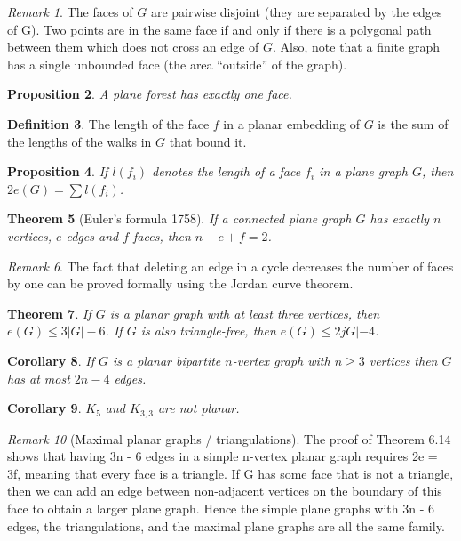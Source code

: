 \documentclass[10pt, fleqn, a4paper, landscape]{article}
\theoremstyle{plain} %
\newtheorem{thm}{Theorem}
\newtheorem{pro}[thm]{Proposition}
\newtheorem{cor}[thm]{Corollary}
\theoremstyle{remark} %
\newtheorem{rem}[thm]{Remark}
\theoremstyle{definition} %
\newtheorem{defi}[thm]{Definition}
\begin{document}
\begin{multicols}{3}
\begin{tiny}
\begin{rem}
The faces of $G$ are pairwise disjoint (they are separated by the edges of G). Two points are in the same face if and only if there is a polygonal path between them which does not cross an edge of $G$. Also, note that a finite graph has a single unbounded face (the area “outside” of the graph).
\end{rem}

\begin{pro}
A plane forest has exactly one face.
\end{pro}

\begin{defi}
The length of the face $f$ in a planar embedding of $G$ is the sum of the lengths of the walks in $G$ that bound it.
\end{defi}
\addtocounter{thm}{1}
\begin{pro}
If $l(f_i)$ denotes the length of a face $f_i$ in a plane graph $G$, then $2e(G) = \sum l(f_i)$.
\end{pro}

\begin{thm}[Euler's formula 1758]
If a connected plane graph $G$ has exactly $n$ vertices, $e$ edges
and $f$ faces, then $n - e + f = 2$.
\end{thm}

\begin{rem}
The fact that deleting an edge in a cycle decreases the number of faces by one can be proved formally using the Jordan curve theorem.
\end{rem}
\begin{thm}
If $G$ is a planar graph with at least three vertices, then $e(G) \le 3|G|- 6$. If $G$ is also triangle-free, then $e(G)\le 2jG|- 4$.
\end{thm}

\begin{cor}
If $G$ is a planar bipartite $n$-vertex graph with $n \ge 3$ vertices then $G$ has at most $2n - 4$ edges.
\end{cor}

\begin{cor}
$K_5$ and $K_{3,3}$ are not planar.
\end{cor}

\begin{rem}[Maximal planar graphs / triangulations]
The proof of Theorem 6.14 shows that
having 3n - 6 edges in a simple n-vertex planar graph requires 2e = 3f, meaning that every face is
a triangle. If G has some face that is not a triangle, then we can add an edge between non-adjacent
vertices on the boundary of this face to obtain a larger plane graph. Hence the simple plane graphs
with 3n - 6 edges, the triangulations, and the maximal plane graphs are all the same family.
\end{rem}


\end{tiny}
\end{multicols}
\end{document}
